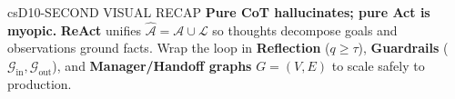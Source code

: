 \documentclass[../../../../master.tex]{subfiles}
\begin{document}
\begin{cscolumns}
\begin{cscard}{csD}{10-SECOND VISUAL RECAP}
  \sffamily\footnotesize
  \textbf{Pure CoT hallucinates; pure Act is myopic.}
  \textbf{ReAct} unifies $\hat{\mathcal{A}}=\mathcal{A}\cup\mathcal{L}$ so thoughts decompose goals and observations ground facts.
  Wrap the loop in \textbf{Reflection} ($q\ge\tau$), \textbf{Guardrails} ($\mathcal{G}_{\mathrm{in}},\mathcal{G}_{\mathrm{out}}$), and \textbf{Manager/Handoff graphs} $G=(V,E)$ to scale safely to production.
\end{cscard}
\end{cscolumns}

\csend
\end{document}
